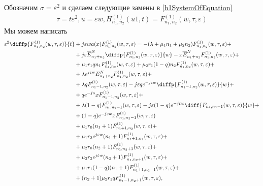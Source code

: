 Обозначим $\sigma = \varepsilon^{2}$ и сделаем следующие замены в \eqref{h1SystemOfEquation}
\begin{align}
\tau=t\varepsilon^{2},u=\varepsilon w, H_{n_{1}, n_{2}}^{(1)}(u1,t)=F_{n_{1}, n_{2}}^{(1)}(w,\tau,\varepsilon)
\end{align}
Мы можем написать 
\begin{equation}
	\begin{split}
		\varepsilon^{2}\diffp{F_{n_{1}, n_{2}}^{(1)}(w,\tau,\varepsilon)}{t}&+j\varepsilon wa(x) F_{n_{1}, n_{2}}^{(1)}(w,\tau,\varepsilon)=
		-(\lambda+\mu_{1}n_{1}+\mu_{2}n_{2})F_{n_{1}, n_{2}}^{(1)}(w,\tau,\varepsilon) +\\
		&+ j\varepsilon \overline{E}_{n_{1}+n_{2}}^N\diffp{F_{n_{1}, n_{2}}^{(1)}(w,\tau,\varepsilon)}{w}-x\overline{E}_{n_{1}+n_{2}}^NF_{n_{1}, n_{2}}^{(1)}(w,\tau,\varepsilon)+\\
		&+\mu_{1}r_{1}q n_{1}F_{n_{1}, n_{2}}^{(1)}(w,\tau,\varepsilon)+ \mu_{2}r_{1}(1-q)n_{2}F_{n_{1}, n_{2}}^{(1)}(w,\tau,\varepsilon)+\\
		&+ \lambda e^{j\varepsilon w} E_{n_{1}+n_{2}}^N F_{n_{1}, n_{2}}^{(1)}(w,\tau,\varepsilon)+\\
		&+\lambda qF_{n_{1}-1, n_{2}}^{(1)}(w,\tau,\varepsilon) - j \varepsilon q  e^{-j\varepsilon w} \diffp{F_{n_{1}-1, n_{2}}^{(1)}(w,\tau,\varepsilon)}{w}+\\
		&+ q  e^{-ju} xF_{n_{1}-1, n_{2}}^{(1)}(w,\tau,\varepsilon)+\\
		&+\lambda (1-q)F_{n_{1}, n_{2}-1}^{(1)}(w,\tau,\varepsilon) - j \varepsilon (1-q) e^{-j\varepsilon w} \diff{F_{n_{1}, n_{2}-1}(w,\tau,\varepsilon)}{w}+\\
		&+ (1-q) e^{-j\varepsilon w} x F_{n_{1}, n_{2}-1}^{(1)}(w,\tau,\varepsilon)\\
		&+ \mu_{1} r_{0}(n_{1}+1) F_{n_{1} +1 , n_{2}}^{(1)}(w,\tau,\varepsilon)+\\
		& + \mu_{1} r_{2}  e^{j \varepsilon w}(n_{1}+1)F_{n_{1} + 1, n_{2}}^{(1)}(w,\tau,\varepsilon)+\\
		&+ \mu_{2} r_{0}(n_{2}+1) F_{n_{1}, n_{2} + 1 }^{(1)}(w,\tau,\varepsilon)+\\
		& + \mu_{2} r_{2}  e^{j\varepsilon w}(n_{2}+1) F_{n_{1}, n_{2} + 1}^{(1)}(w,\tau,\varepsilon)+\\
		&+\mu_{1} r_{1}(1-q)(n_{1}+1) F_{n_{1} +1 , n_{2}-1}^{(1)}(w,\tau,\varepsilon)+\\
		&+(n_{2}+1)\mu_{2} r_{1}q F_{n_{1} -1 , n_{2}+1}^{(1)}(w,\tau,\varepsilon) ,\\

\end{split}
\end{equation}
